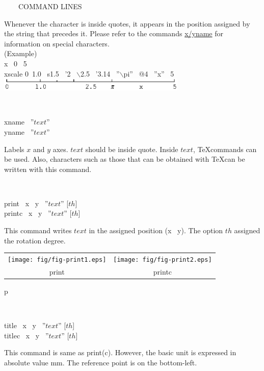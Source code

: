 \begin{qsection}{\ ~~~COMMAND LINES}
\begin{minipage}[t]{9cm}
Whenever the character is inside quotes,
it appears in the position assigned
by the string that precedes it.
Please refer to the commands \hyperlink{xyname}{x/yname} for information on
special characters.\\
(Example)\\
x ~0 ~5\\
xscale 0~1.0 ~s1.5 ~'2 ~$\backslash$2.5 ~'3.14 ~''$\backslash$pi'' ~@4 ~''x'' ~5\\

\includegraphics[width=9cm]{fig/scale.eps}
\end{minipage}\\

\hypertarget{xyname}{}
\begin{minipage}[t]{5.5cm}
xname ~''$text$''\\
yname ~''$text$''\\
\end{minipage}
\begin{minipage}[t]{9cm}
Labels $x$ and $y$ axes.
$text$ should be inside quote.
Inside $text$, \TeX commands can be used.
Also, characters such as those that can be obtained
with \TeX can be written with this command.
\end{minipage}\\

\begin{minipage}[t]{5.5cm}
 print ~x ~y ~''$text$'' [$th$]\\
 printc ~x ~y ~''$text$'' [$th$]
\end{minipage}
\begin{minipage}[t]{9cm}
This command writes $text$ in the assigned position (x ~y).
The option $th$ assigned the rotation degree.

\begin{tabular}{cc}
\texttt{[image: fig/fig-print1.eps]}&  
\texttt{[image: fig/fig-print2.eps]}\\
print&printc
\end{tabular}p
\end{minipage}\\

\begin{minipage}[t]{5.5cm}
title ~x ~y ~''$text$'' [$th$]\\
titlec ~x ~y ~''$text$'' [$th$]
\end{minipage}
\begin{minipage}[t]{9cm}
This command is same as print(c).
However, the basic unit is expressed in absolute value mm.
The reference point is on the bottom-left.
\end{minipage}\\


\end{qsection}
